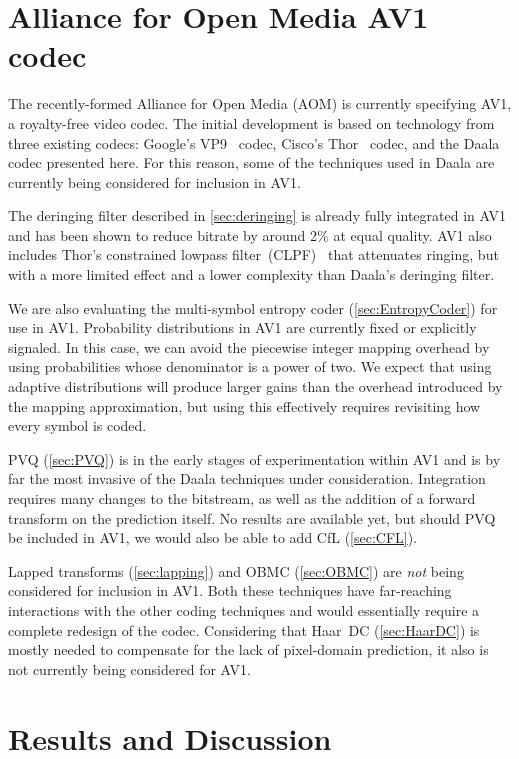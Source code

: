 \documentclass[english,conference,10pt]{IEEEtran}
\begin{document}
\section{Alliance for Open Media AV1 codec}
\label{sec:AOM}

The recently-formed Alliance for Open Media (AOM) is currently specifying
AV1, a royalty-free video codec. The initial development is based on
technology from three existing codecs: Google's VP9~\cite{VP9Spec} codec,
Cisco's Thor~\cite{ThorDraft} codec, and the Daala codec presented
here. For this reason, some of the techniques used in Daala are currently
being considered for inclusion in AV1.

The deringing filter described in \cref{sec:deringing} is already
fully integrated in AV1 and has been shown to reduce bitrate by around 2\%
at equal quality. AV1 also includes Thor's constrained lowpass
filter~(CLPF)~\cite{CLPFDraft} that attenuates ringing, but with a more
limited effect and a lower complexity than Daala's deringing filter.

We are also evaluating the multi-symbol entropy coder (\cref{sec:EntropyCoder})
for use in AV1. Probability distributions in AV1 are currently fixed or
explicitly signaled. In this case, we can avoid the piecewise integer mapping
overhead by using probabilities whose denominator is a power of two. We expect
that using adaptive distributions will produce larger gains than the overhead
introduced by the mapping approximation, but using this effectively requires
revisiting how every symbol is coded.

PVQ (\cref{sec:PVQ}) is in the early stages of experimentation within AV1 and
is by far the most invasive of the Daala techniques under consideration.
Integration requires many changes to the bitstream, as well as the addition
of a forward transform on the
prediction itself. No results are available yet, but should PVQ be
included in AV1, we would also be able to add CfL (\cref{sec:CFL}).

Lapped transforms (\cref{sec:lapping}) and OBMC (\cref{sec:OBMC}) are 
\textit{not} being considered for inclusion
in AV1. Both these techniques have far-reaching interactions with the
other coding techniques and would essentially require a complete redesign
of the codec. Considering that Haar~DC (\cref{sec:HaarDC}) is mostly
needed to compensate for the
lack of pixel-domain prediction, it also is not currently being considered for AV1.

\section{Results and Discussion}
\label{sec:Results}
\end{document}
